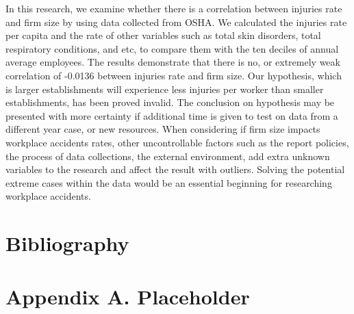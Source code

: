 \documentclass[12pt]{article}
\begin{document}
In this research, we examine whether there is a correlation between injuries rate and firm size by using data collected from OSHA. We calculated the injuries rate per capita and the rate of other variables such as total skin disorders, total respiratory conditions, and etc, to compare them with the ten deciles of annual average employees. The results demonstrate that there is no, or extremely weak correlation of -0.0136 between injuries rate and firm size. Our hypothesis, which is larger establishments will experience less injuries per worker than smaller establishments, has been proved invalid. The conclusion on hypothesis may be presented with more certainty if additional time is given to test on data from a different year case, or new resources. When considering if firm size impacts workplace accidents rates, other uncontrollable factors such as the report policies, the process of data collections, the external environment, add extra unknown variables to the research and affect the result with outliers. Solving the potential extreme cases within the data would be an essential beginning for researching workplace accidents.

\newpage
\section*{Bibliography}
\singlespacing
\setlength\bibsep{0pt}


\newpage
\section*{Appendix A. Placeholder} \label{sec:appendixa}
\end{document}
